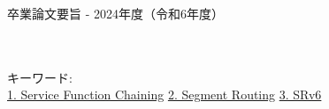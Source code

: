 卒業論文要旨 - 2024年度（令和6年度）
\begin{center}
\begin{large}
\end{large}
\end{center}

~ \\

~ \\
キーワード:\\
\underline{1. Service Function Chaining}
\underline{2. Segment Routing}
\underline{3. SRv6}
\begin{flushright}
\dept \\
\author
\end{flushright}
